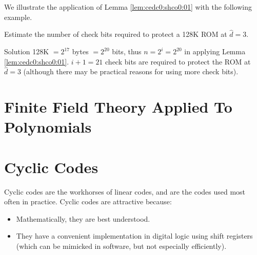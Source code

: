 We illustrate the application of Lemma \ref{lem:cedc0:shco0:01} with the following
example.

\begin{vworkexamplestatement}
\label{ex:cedc0:shco0:01}
Estimate the number of check bits required
to protect a 128K ROM at $\hat{d}=3$.
\end{vworkexamplestatement}
\begin{vworkexampleparsection}{Solution}
128K $=2^{17}$ bytes $=2^{20}$ bits, thus $n=2^i=2^{20}$ in applying 
Lemma \ref{lem:cedc0:shco0:01}.  $i+1=21$ check bits are required to protect
the ROM at $\hat{d}=3$ (although there may be practical reasons for using more check bits). 
\end{vworkexampleparsection}
\vworkexamplefooter{}


\section{Finite Field Theory Applied To Polynomials}
\label{cedc0:sfft1}


\section{Cyclic Codes}
\label{cedc0:scco0}

Cyclic codes are the workhorses of linear codes, and are the codes used 
most often in practice.  Cyclic codes are attractive because:

\begin{itemize}
\item Mathematically, they are best understood.
\item They have a convenient implementation in digital logic using shift
      registers (which can be mimicked in software, but not especially
      efficiently).
\end{itemize}

